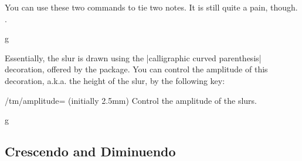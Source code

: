 You can use these two commands to tie two notes. It is still quite a pain, though. 
.
\begin{codeexample}[]
\begin{tmline}
\begin{tmstaff}{g}{}
\end{tmstaff}
\end{tmline}
\end{codeexample}
Essentially, the slur is drawn using the |calligraphic curved parenthesis| 
decoration, offered by the  package. You can control the amplitude of 
this decoration, a.k.a. the height of the slur, by the following key:
\begin{key}{/tm/amplitude= (initially 2.5mm)}
  Control the amplitude of the slurs.
\end{key}
\begin{codeexample}[]
\begin{tmline}
\begin{tmstaff}{g}{}
\end{tmstaff}
\end{tmline}
\end{codeexample}
\subsection{Crescendo and Diminuendo}\label{sec:line:cresc-dim}

